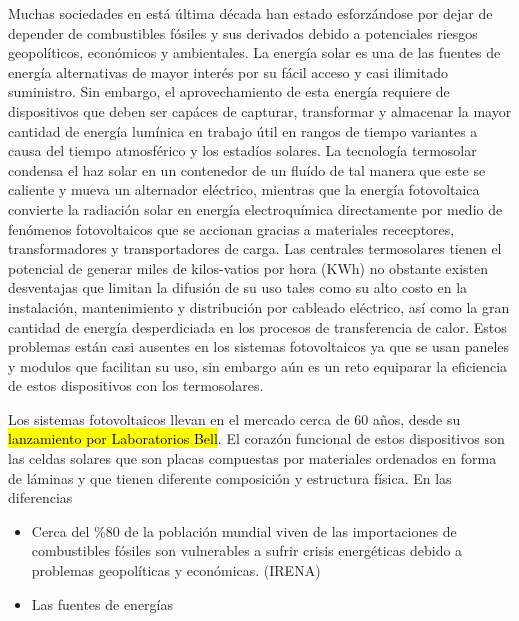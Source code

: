 Muchas sociedades en está última década han estado esforzándose por dejar de depender de combustibles
fósiles y sus derivados debido a potenciales riesgos geopolíticos, económicos y ambientales. La energía solar
es una de las fuentes de energía alternativas de mayor interés por su fácil acceso y casi ilimitado suministro.
Sin embargo, el aprovechamiento de esta energía requiere de dispositivos que deben ser capáces de capturar, transformar 
y almacenar la mayor cantidad de energía lumínica en trabajo útil en rangos de tiempo variantes a causa del tiempo atmosférico y
los estadíos solares. La tecnología termosolar condensa el haz solar en un contenedor de un fluído de tal manera que este se caliente
y mueva un alternador eléctrico, mientras que la energía fotovoltaica convierte la radiación solar en energía electroquímica directamente 
por medio de fenómenos fotovoltaicos que se accionan gracias a materiales rececptores, transformadores y transportadores de carga.
Las centrales termosolares tienen el potencial de generar miles de kilos-vatios por hora (KWh) no obstante 
existen desventajas que limitan la difusión de su uso tales como su alto costo en la instalación, mantenimiento y distribución por cableado 
eléctrico, así como la gran cantidad de energía desperdiciada en los procesos de transferencia de calor. Estos problemas están casi ausentes
en los sistemas fotovoltaicos ya que se usan paneles y modulos que facilitan su uso, sin embargo aún es un reto equiparar la eficiencia de estos 
dispositivos con los termosolares. 

Los sistemas fotovoltaicos llevan en el mercado cerca de 60 años, desde su \hl{lanzamiento por Laboratorios Bell}. El corazón funcional de estos 
dispositivos son las celdas solares que son placas compuestas por materiales ordenados en forma de láminas y que tienen diferente composición y
estructura física. En las diferencias 



\begin{itemize}
    \item Cerca del \%80 de la población mundial viven de las importaciones 
     de combustibles fósiles son vulnerables a sufrir crisis energéticas
     debido a problemas geopolíticas y económicas.
     (IRENA)
    
    \item Las fuentes de energías 
\end{itemize}
